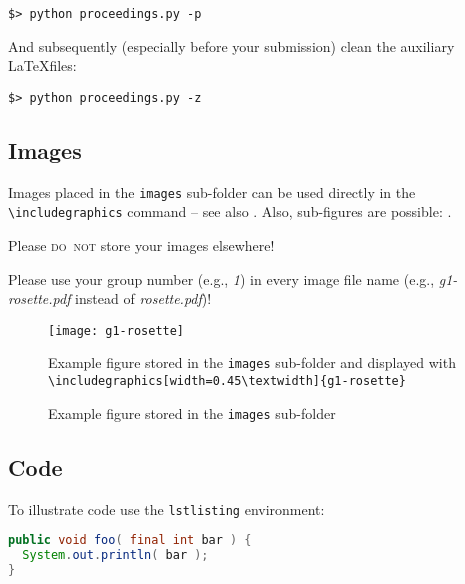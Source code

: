 \begin{center}
    \verb|$> python proceedings.py -p|
\end{center}

And subsequently (especially before your submission) clean the auxiliary \LaTeX files:

\begin{center}
    \verb|$> python proceedings.py -z|
\end{center}


\subsection*{Images}
Images placed in the \texttt{images} sub-folder can be used directly in the \texttt{\textbackslash includegraphics} command -- see also . Also, sub-figures are possible: .

Please \textsc{do~not} store your images elsewhere! 

Please use your group number (e.g., \textit{1}) in every image file name (e.g., \textit{g1-rosette.pdf} instead of \textit{rosette.pdf})!

\begin{figure}[tb]
\centering
\texttt{[image: g1-rosette]}
\caption{Example figure stored in the \texttt{images} sub-folder and displayed with \texttt{\textbackslash includegraphics[width=0.45\textbackslash textwidth]\{g1-rosette\}}}
\label{fig:rosette}
\end{figure}

\begin{figure}[tb]
\centering
    \qquad
\caption{Example figure stored in the \texttt{images} sub-folder}
\label{fig:example subfigure}
\end{figure}


\subsection*{Code}
To illustrate code use the \texttt{lstlisting} environment:
\begin{lstlisting}[language=Java]
public void foo( final int bar ) {
  System.out.println( bar );
}
\end{lstlisting}


